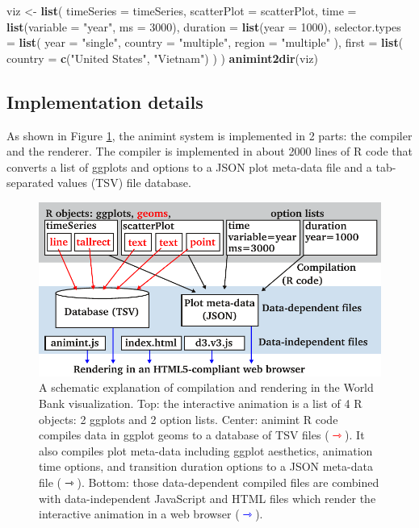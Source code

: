 \documentclass[12pt,]{article}
\newenvironment{Shaded}{\begin{snugshade}}{\end{snugshade}}
\newcommand{\KeywordTok}[1]{\textcolor[rgb]{0.13,0.29,0.53}{\textbf{#1}}}
\newcommand{\DataTypeTok}[1]{\textcolor[rgb]{0.13,0.29,0.53}{#1}}
\newcommand{\DecValTok}[1]{\textcolor[rgb]{0.00,0.00,0.81}{#1}}
\newcommand{\StringTok}[1]{\textcolor[rgb]{0.31,0.60,0.02}{#1}}
\newcommand{\NormalTok}[1]{#1}
\theoremstyle{definition}
\theoremstyle{definition}
\theoremstyle{remark}
\begin{document}
\begin{Shaded}
\begin{Highlighting}[]
\NormalTok{viz <-}\StringTok{ }\KeywordTok{list}\NormalTok{(}
  \DataTypeTok{timeSeries =}\NormalTok{ timeSeries,}
  \DataTypeTok{scatterPlot =}\NormalTok{ scatterPlot,}
  \DataTypeTok{time =} \KeywordTok{list}\NormalTok{(}\DataTypeTok{variable =} \StringTok{"year"}\NormalTok{, }\DataTypeTok{ms =} \DecValTok{3000}\NormalTok{),}
  \DataTypeTok{duration =} \KeywordTok{list}\NormalTok{(}\DataTypeTok{year =} \DecValTok{1000}\NormalTok{),}
  \DataTypeTok{selector.types =} \KeywordTok{list}\NormalTok{(}
    \DataTypeTok{year =} \StringTok{"single"}\NormalTok{,}
    \DataTypeTok{country =} \StringTok{"multiple"}\NormalTok{,}
    \DataTypeTok{region =} \StringTok{"multiple"}
\NormalTok{  ),}
  \DataTypeTok{first =} \KeywordTok{list}\NormalTok{(}
    \DataTypeTok{country =} \KeywordTok{c}\NormalTok{(}\StringTok{"United States"}\NormalTok{, }\StringTok{"Vietnam"}\NormalTok{)}
\NormalTok{  )}
\NormalTok{)}
\KeywordTok{animint2dir}\NormalTok{(viz)}
\end{Highlighting}
\end{Shaded}

\subsection{Implementation details}\label{implementation}

As shown in Figure \ref{fig:design}, the animint system is implemented
in 2 parts: the compiler and the renderer. The compiler is implemented
in about 2000 lines of R code that converts a list of ggplots and
options to a JSON plot meta-data file and a tab-separated values (TSV)
file database.

\begin{figure}
\centering
\includegraphics{images/figure-design.pdf}
\caption{\label{fig:design}A schematic explanation of compilation and
rendering in the World Bank visualization. Top: the interactive
animation is a list of 4 R objects: 2 ggplots and 2 option lists.
Center: animint R code compiles data in ggplot geoms to a database of
TSV files (\textcolor{red}{$\rightarrowtriangle$}). It also compiles
plot meta-data including ggplot aesthetics, animation time options, and
transition duration options to a JSON meta-data file
(\(\rightarrowtriangle\)). Bottom: those data-dependent compiled files
are combined with data-independent JavaScript and HTML files which
render the interactive animation in a web browser
(\textcolor{blue}{$\rightarrowtriangle$}).}
\end{figure}
\end{document}
